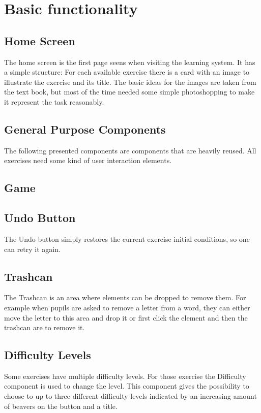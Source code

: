 \section{Basic functionality}

\subsection{Home Screen}

The home screen is the first page seens when visiting the learning system. It has a simple structure: For each available exercise there is a card with an image to illustrate the exercise and its title. The basic ideas for the images are taken from the text book, but most of the time needed some simple photoshopping to make it represent the task reasonably.

\subsection{General Purpose Components}

The following presented components are components that are heavily reused. All exercises need some kind of user interaction elements.

\subsection*{Game}

\subsection*{Undo Button}
The Undo button simply restores the current exercise initial conditions, so one can retry it again.

\subsection*{Trashcan}
The Trashcan is an area where elements can be dropped to remove them. For example when pupils are asked to remove a letter from a word, they can either move the letter to this area and drop it or first click the element and then the trashcan are to remove it.

\subsection*{Difficulty Levels}
Some exercises have multiple difficulty levels. For those exercise the Difficulty component is used to change the level. This component gives the possibility to choose to up to three different difficulty levels indicated by an increasing amount of beavers on the button and a title.

